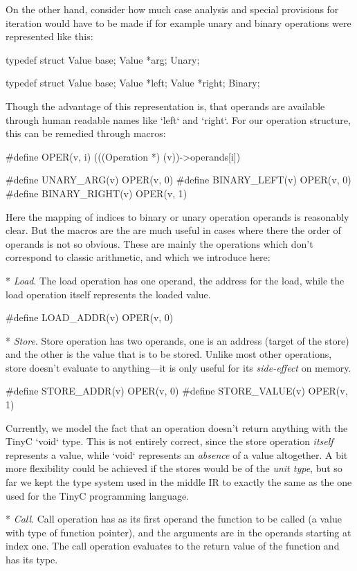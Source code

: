 On the other hand, consider how much case analysis and special provisions for
iteration would have to be made if for example unary and binary operations were
represented like this:

\begtt
typedef struct {
	Value base;
	Value *arg;
} Unary;

typedef struct {
	Value base;
	Value *left;
	Value *right;
} Binary;
\endtt

Though the advantage of this representation is, that operands are available
through human readable names like `left` and `right`. For our operation
structure, this can be remedied through macros:

\begtt
#define OPER(v, i) (((Operation *) (v))->operands[i])

#define UNARY_ARG(v)     OPER(v, 0)
#define BINARY_LEFT(v)   OPER(v, 0)
#define BINARY_RIGHT(v)  OPER(v, 1)
\endtt

Here the mapping of indices to binary or unary operation operands is reasonably
clear. But the macros are the are much useful in cases where there the order of
operands is not so obvious. These are mainly the operations which don't
correspond to classic arithmetic, and which we introduce here:

\begitems

* {\em Load}. The load operation has one operand, the address for the load,
while the load operation itself represents the loaded value.

\begtt
#define LOAD_ADDR(v) OPER(v, 0)
\endtt

* {\em Store}. Store operation has two operands, one is an address (target of
the store) and the other is the value that is to be stored. Unlike most other
operations, store doesn't evaluate to anything---it is only useful for its
{\em side-effect} on memory.

\begtt
#define STORE_ADDR(v)  OPER(v, 0)
#define STORE_VALUE(v) OPER(v, 1)
\endtt

Currently, we model the fact that an operation doesn't return anything with the
TinyC `void` type. This is not entirely correct, since the store operation {\em itself}
represents a value, while `void` represents an {\em absence} of a value
altogether. A bit more flexibility could be achieved if the stores would be of
the {\em unit type}, but so far we kept the type system used in the middle IR to
exactly the same as the one used for the TinyC programming language.

* {\em Call}. Call operation has as its first operand the function to be called
(a value with type of function pointer), and the arguments are in the operands
starting at index one. The call operation evaluates to the return value of the
function and has its type.

